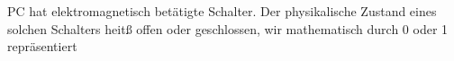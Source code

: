 

PC hat elektromagnetisch betätigte Schalter. Der physikalische Zustand eines solchen Schalters heitß offen oder geschlossen, wir mathematisch durch 0 oder 1 repräsentiert